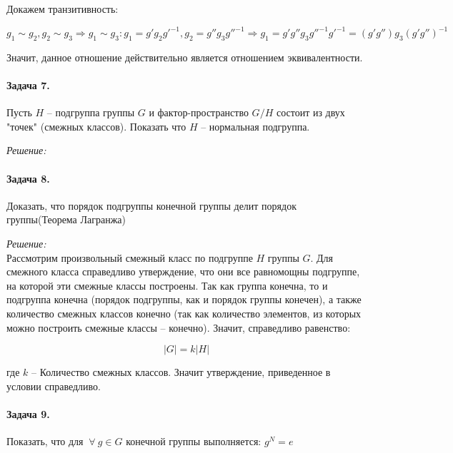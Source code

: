 \documentclass[10pt,a4paper]{article}
\begin{document}
	Докажем транзитивность:
	
	\begin{equation}
		\label{eq:ex_6_eq_03}
		g_{1} \sim g_{2}, g_{2} \sim g_{3} \Rightarrow g_{1} \sim g_{3}:
		g_{1} = g'g_{2}g'^{-1}, g_{2} = g''g_{3}g''^{-1} \Rightarrow 
		g_{1} = g'g''g_{3}g''^{-1}g'^{-1} = \left(g'g''\right)g_{3}
		\left(g'g''\right)^{-1}
	\end{equation}
	
	Значит, данное отношение действительно является отношением эквивалентности.
	
	\paragraph{Задача 7.}Пусть $H$ -- подгруппа группы $G$ и фактор-пространство 
	$G/H$ состоит из двух "точек" (смежных классов). Показать что $H$ -- 
	нормальная подгруппа.
	
	\textit{Решение:}\\
	
	\paragraph{Задача 8.} Доказать, что порядок подгруппы конечной группы делит
	порядок группы(Теорема Лагранжа)
	
	\textit{Решение:}\\
	
	Рассмотрим произвольный смежный класс по подгруппе $H$ группы $G$. Для 
	смежного класса справедливо утверждение, что они все равномощны подгруппе, 
	на которой эти смежные классы построены. Так как группа конечна, то и 
	подгруппа конечна (порядок подгруппы, как и порядок группы конечен), а также
	количество смежных классов конечно (так как количество элементов, из которых 
	можно построить смежные классы -- конечно). Значит, справедливо равенство:
	
	\begin{equation}
		\label{eq:ex_8_eq_01}
		\left|G\right| = k\left|H\right|
	\end{equation}
	
	где $k$ -- Количество смежных классов. Значит утверждение, приведенное в 
	условии справедливо.
	
	\paragraph{Задача 9.} Показать, что для $\ \forall \ g\in G$ конечной 
	группы выполняется: $g^{N} = e$
	
\end{document}
